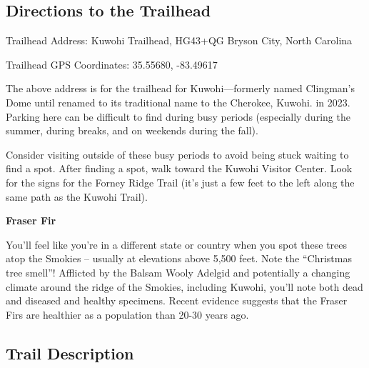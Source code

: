 \documentclass[
  letterpaper,
  DIV=11,
  numbers=noendperiod]{scrreprt}
\begin{document}
\subsection{Directions to the
Trailhead}\label{directions-to-the-trailhead-28}

Trailhead Address: Kuwohi Trailhead, HG43+QG Bryson City, North Carolina

Trailhead GPS Coordinates: 35.55680, -83.49617

The above address is for the trailhead for Kuwohi---formerly named
Clingman's Dome until renamed to its traditional name to the Cherokee,
Kuwohi. in 2023. Parking here can be difficult to find during busy
periods (especially during the summer, during breaks, and on weekends
during the fall).

Consider visiting outside of these busy periods to avoid being stuck
waiting to find a spot. After finding a spot, walk toward the Kuwohi
Visitor Center. Look for the signs for the Forney Ridge Trail (it's just
a few feet to the left along the same path as the Kuwohi Trail).

\begin{tcolorbox}[enhanced jigsaw, opacityback=0, bottomrule=.15mm, colframe=quarto-callout-note-color-frame, breakable, arc=.35mm, leftrule=.75mm, rightrule=.15mm, toprule=.15mm, left=2mm, colback=white]
\begin{minipage}[t]{5.5mm}
\textcolor{quarto-callout-note-color}{\faInfo}
\end{minipage}%
\begin{minipage}[t]{\textwidth - 5.5mm}

\vspace{-3mm}\textbf{Fraser Fir}\vspace{3mm}

You'll feel like you're in a different state or country when you spot
these trees atop the Smokies -- usually at elevations above 5,500 feet.
Note the ``Christmas tree smell''! Afflicted by the Balsam Wooly Adelgid
and potentially a changing climate around the ridge of the Smokies,
including Kuwohi, you'll note both dead and diseased and healthy
specimens. Recent evidence suggests that the Fraser Firs are healthier
as a population than 20-30 years ago.

\end{minipage}%
\end{tcolorbox}

\subsection{Trail Description}\label{trail-description-28}
\end{document}
